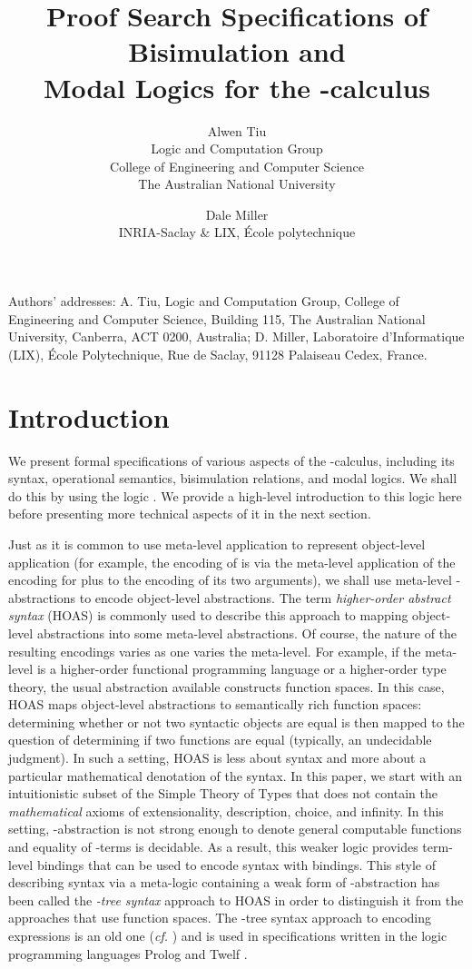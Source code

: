\documentclass{acmtrans2m}
\title{Proof Search Specifications of Bisimulation and\\
       Modal Logics for the -calculus}
\author{Alwen Tiu \\ Logic and Computation Group\\ 
College of Engineering and Computer Science\\
The Australian National University
\and 
Dale Miller\\ INRIA-Saclay \& LIX, \'Ecole polytechnique}
\begin{document}
\begin{bottomstuff}
Authors' addresses: A. Tiu, Logic and Computation Group, College of Engineering
and Computer Science, Building 115, The Australian National University,
Canberra, ACT 0200, Australia; D. Miller, Laboratoire d'Informatique
(LIX), \'Ecole Polytechnique, Rue de Saclay, 91128 Palaiseau Cedex,
France. 
\end{bottomstuff}
\maketitle

\section{Introduction}
\label{sec:intro}

We present formal specifications of various aspects of the
-calculus, including its syntax, operational semantics,
bisimulation relations, and modal logics.  We shall do this by using
the  logic \cite{miller05tocl}.  We provide a high-level
introduction to this logic here before presenting more technical
aspects of it in the next section.

Just as it is common to use meta-level application to represent
object-level application (for example, the encoding of  is via
the meta-level application of the encoding for plus to the encoding of
its two arguments), we shall use meta-level -abstractions to
encode object-level abstractions.  The term {\em higher-order abstract
  syntax} (HOAS) \cite{pfenning88pldi} is commonly used to describe
this approach to mapping object-level abstractions into some
meta-level abstractions.  Of course, the nature of the resulting
encodings varies as one varies the meta-level.  For example, if the
meta-level is a higher-order functional programming language or a
higher-order type theory, the usual abstraction available constructs
function spaces.  In this case, HOAS maps object-level abstractions to
semantically rich function spaces: determining whether or not two
syntactic objects are equal is then mapped to the question of
determining if two functions are equal (typically, an undecidable
judgment).  In such a setting, HOAS is less about syntax and more
about a particular mathematical denotation of the syntax.  In this
paper, we start with an intuitionistic subset of the Simple Theory of
Types \cite{church40} that does not contain the {\em mathematical}
axioms of extensionality, description, choice, and infinity.  In this
setting, -abstraction is not strong enough to denote general
computable functions and equality of -terms is decidable.  As
a result, this weaker logic provides term-level bindings that can be
used to encode syntax with bindings.  This style of describing syntax
via a meta-logic containing a weak form of -abstraction has
been called the {\em -tree syntax} \cite{miller00cl} approach
to HOAS in order to distinguish it from the approaches that use
function spaces.  The -tree syntax approach to encoding
expressions is an old one ({\em cf.}
\cite{huet78,miller86acl,miller87slp,paulson86jlp}) and is used in
specifications written in the logic programming languages
Prolog \cite{nadathur88iclp} and Twelf \cite{pfenning99cade}.
\end{document}
